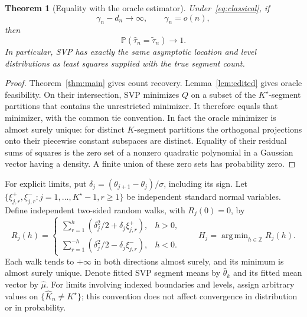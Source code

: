 \documentclass[pdflatex,sn-mathphys-num]{sn-jnl}
\DeclareMathOperator*{\argmin}{arg\,min}
\newcommand{\Prob}{\mathbb P}
\newcommand{\Z}{\mathbb Z}
\newcommand{\Kh}{\widehat K_n}
\newcommand{\tht}{\widehat\tau_n}
\newcommand{\tol}{\widetilde\tau_n}
\theoremstyle{thmstyleone}
\newtheorem{theorem}{Theorem}
\theoremstyle{thmstyletwo}
\begin{document}
\begin{theorem}[Equality with the oracle estimator]\label{thm:oracle}
Under~\eqref{eq:classical}, if
\begin{equation}\label{eq:oracle-threshold}
\gamma_n-d_n\to\infty,\qquad \gamma_n=o(n),
\end{equation}
then
\begin{equation}\label{eq:oracle-equality}
\Prob(\tht=\tol)\longrightarrow1.
\end{equation}
In particular, SVP has exactly the same asymptotic location and level
distributions as least squares supplied with the true segment count.
\end{theorem}
\begin{proof}
Theorem~\ref{thm:main} gives count recovery. Lemma~\ref{lem:edited} gives
oracle feasibility. On their intersection, SVP minimizes $Q$ on a subset
of the $K^\star$-segment partitions that contains the unrestricted minimizer.
It therefore equals that minimizer, with the common tie convention.
In fact the oracle minimizer is almost surely unique: for distinct
$K$-segment partitions the orthogonal projections onto their piecewise
constant subspaces are distinct. Equality of their residual sums of squares
is the zero set of a nonzero quadratic polynomial in a Gaussian vector
having a density. A finite union of these zero sets has probability zero.
\end{proof}

For explicit limits, put $\delta_j=(\theta_{j+1}-\theta_j)/\sigma$, including
its sign. Let $\{\xi_{j,r}^{+},\xi_{j,r}^{-}:j=1,\ldots,K^\star-1,r\ge1\}$
be independent standard normal variables. Define independent two-sided
random walks, with $R_j(0)=0$, by
\begin{equation}\label{eq:random-walk}
R_j(h)=
\begin{cases}
\displaystyle\sum_{r=1}^{h}(\delta_j^2/2+\delta_j\xi_{j,r}^{+}),&h>0,\\[0.3em]
\displaystyle\sum_{r=1}^{-h}(\delta_j^2/2-\delta_j\xi_{j,r}^{-}),&h<0.
\end{cases}
\qquad H_j=\argmin_{h\in\Z}R_j(h).
\end{equation}
Each walk tends to $+\infty$ in both directions almost surely, and its
minimum is almost surely unique. Denote fitted SVP segment means by
$\widehat\theta_k$ and its fitted mean vector by $\widehat\mu$.
For limits involving indexed boundaries and levels, assign arbitrary
values on $\{\Kh\ne K^\star\}$; this convention does not affect convergence
in distribution or in probability.
\end{document}
